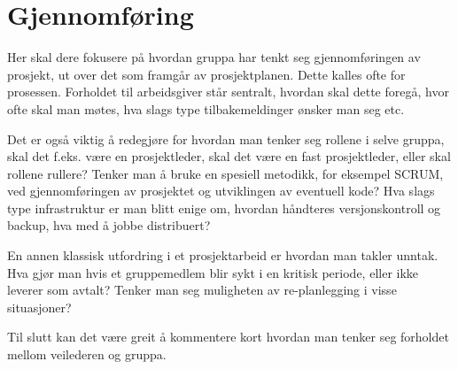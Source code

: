 \documentclass[11pt,a4paper]{report}
\begin{document}
\section*{Gjennomføring}

Her skal dere  fokusere på hvordan gruppa har tenkt seg gjennomføringen av prosjekt, ut over det som framgår av prosjektplanen. Dette kalles ofte for prosessen. Forholdet til arbeidsgiver står sentralt, hvordan skal dette foregå, hvor ofte skal man møtes, hva slags type tilbakemeldinger ønsker man seg etc.

Det er også viktig å redegjøre for hvordan man tenker seg rollene i selve gruppa, skal det f.eks. være en prosjektleder, skal det være en fast prosjektleder, eller skal rollene rullere? Tenker man å bruke en spesiell metodikk, for eksempel SCRUM, ved gjennomføringen av prosjektet og utviklingen av eventuell kode? Hva slags type infrastruktur er man blitt enige om, hvordan håndteres versjonskontroll og backup, hva med å jobbe distribuert?

En annen klassisk utfordring i et prosjektarbeid er hvordan man takler unntak. Hva gjør man hvis et gruppemedlem blir sykt i en kritisk periode, eller ikke leverer som avtalt? Tenker man seg muligheten av re-planlegging i visse situasjoner?

Til slutt kan det være greit å kommentere kort hvordan man tenker seg forholdet mellom veilederen og gruppa. 
\end{document}
